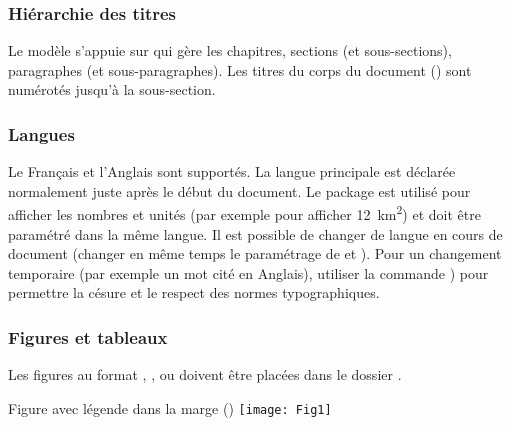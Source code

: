 \documentclass[
  a4paper, %
  11pt, extrafontsizes, %
  onecolumn, %
  openright, %
]{memoir}
\begin{document}
\subsubsection{Hiérarchie des titres}

Le modèle s'appuie sur  qui gère les chapitres, sections (et sous-sections), paragraphes (et sous-paragraphes). 
Les titres du corps du document () sont numérotés jusqu'à la sous-section.

\subsubsection{Langues}

Le Français et l'Anglais sont supportés. 
La langue principale est déclarée normalement juste après le début du document. 
Le package  est utilisé pour afficher les nombres et unités (par exemple  pour afficher \SI{12}{\kilo\meter\squared}) et doit être paramétré dans la même langue. 
Il est possible de changer de langue en cours de document (changer en même temps le paramétrage de  et ). 
Pour un changement temporaire (par exemple un mot cité en Anglais), utiliser la commande ) pour permettre la césure et le respect des normes typographiques.

\subsubsection{Figures et tableaux}

Les figures au format , ,  ou  doivent être placées dans le dossier .

  {Figure avec légende dans la marge ()}
  {\texttt{[image: Fig1]}}
\end{document}
